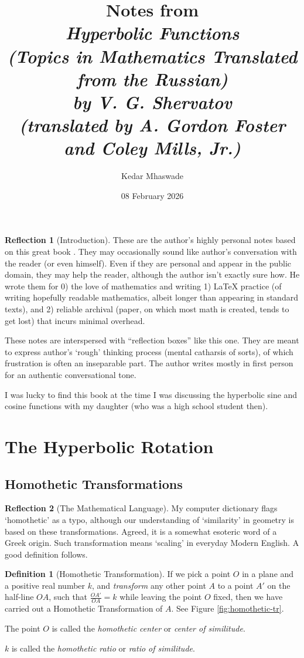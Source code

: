 \documentclass[11pt]{article}
\title{Notes from \\ \emph{Hyperbolic Functions\\ 
(Topics in Mathematics Translated from the Russian)}
\\ \emph{by V. G. Shervatov}
\\ \emph{(translated by A. Gordon Foster and Coley Mills, Jr.)}}
\author{Kedar Mhaswade}
\date{08 February 2026}
\theoremstyle{definition}
\newtheorem{definition}{Definition}
\theoremstyle{plain}
\theoremstyle{problemstyle}
\theoremstyle{remark}
\theoremstyle{definition}
\newtheorem{reflection}{Reflection}
\begin{document}
\maketitle
\begin{reflection}[Introduction]
    These are the author's highly personal notes based on this great book \cite{shervatov}. They may occasionally sound like author's conversation with the reader (or even himself). Even if they are personal and appear in the public domain, they may help the reader, although the author isn't exactly sure how. He wrote them for 0) the love of mathematics and writing 1) \LaTeX{} practice (of writing hopefully readable mathematics, albeit longer than appearing in standard texts), and 2) reliable archival (paper, on which most math is created, tends to get lost) that incurs minimal overhead.

    These notes are interspersed with ``reflection boxes'' like this one. They are meant to express author's `rough' thinking process (mental catharsis of sorts), of which frustration is often an inseparable part. The author writes mostly in first person for an authentic conversational tone.

    I was lucky to find this book at the time I was discussing the hyperbolic sine and cosine functions with my daughter (who was a high school student then). 
\end{reflection}

\section{The Hyperbolic Rotation}
\subsection{Homothetic Transformations}
\begin{reflection}[The Mathematical Language]
    My computer dictionary flags `homothetic' as a typo, although our understanding of `similarity' in geometry is based on these transformations. Agreed, it is a somewhat esoteric word of a Greek origin. Such transformation means `scaling' in everyday Modern English.  A good definition follows. 
\end{reflection}
\begin{definition}[Homothetic Transformation]\label{def:homothetic-tr}
    If we pick a point $O$ in a plane and a positive real number $k$, and \emph{transform} any other point $A$ to a point $A'$ on the half-line $OA$, such that $\frac{OA'}{OA}=k$ while leaving the point $O$ fixed, then we have carried out a Homothetic Transformation of $A$. See Figure \ref{fig:homothetic-tr}.

    The point $O$ is called the \emph{homothetic center} or \emph{center of similitude}.

    $k$ is called the \emph{homothetic ratio} or \emph{ratio of similitude}.
\end{definition}
\end{document}
